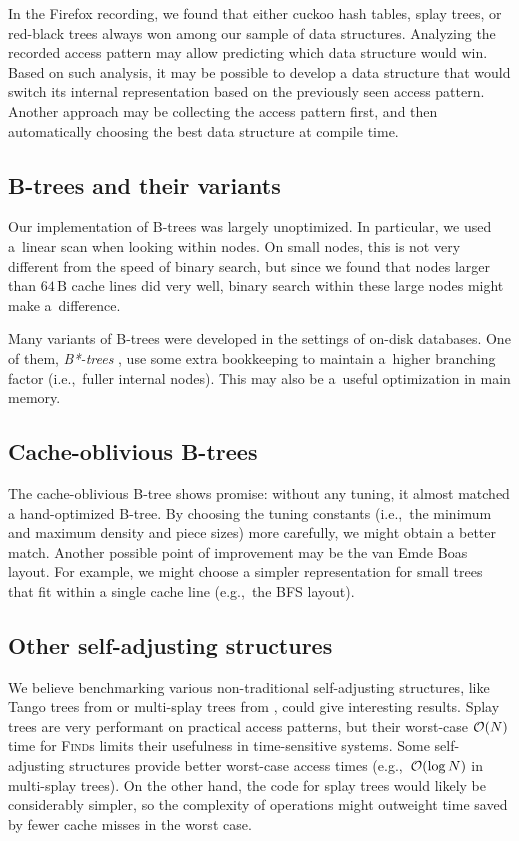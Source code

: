 In the Firefox recording, we found that either cuckoo hash tables, splay trees,
or red-black trees always won among our sample of data structures.
Analyzing the recorded access pattern may allow predicting which data structure
would win. Based on such analysis, it may be possible to develop a data
structure that would switch its internal representation based on the previously
seen access pattern.
Another approach may be collecting the access pattern first, and
then automatically choosing the best data structure at compile time.

\subsection*{B-trees and their variants}
Our implementation of \mbox{B-trees} was largely unoptimized. In particular,
we used a~linear scan when looking within nodes. On small nodes, this is
not very different from the speed of binary search, but since we found
that nodes larger than $64\,\text{B}$ cache lines did very well, binary search
within these large nodes might make a~difference.

Many variants of B-trees were developed in the settings of on-disk databases.
One of them, \emph{B*-trees} \cite{bstar}, use some extra bookkeeping to
maintain a~higher branching factor (i.e.,\ fuller internal nodes).
This may also be a~useful optimization in main memory.

\subsection*{Cache-oblivious B-trees}
The cache-oblivious B-tree shows promise: without any tuning, it almost
matched a hand-optimized B-tree. By choosing the tuning constants (i.e.,\ the
minimum and maximum density and piece sizes) more carefully, we might obtain
a better match. Another possible point of improvement may be the van Emde Boas
layout. For example, we might choose a simpler representation for small trees
that fit within a single cache line (e.g.,\ the BFS layout).

\subsection*{Other self-adjusting structures}
We believe benchmarking various non-traditional self-adjusting structures,
like Tango trees from \cite{tango} or multi-splay trees from
\cite{multisplay-trees}, could give interesting results. Splay trees are very
performant on practical access patterns, but their worst-case $\mathcal{O}(N)$ time
for \textsc{Find}s limits their usefulness in time-sensitive systems. Some self-adjusting
structures provide better worst-case access times (e.g.,\ $\mathcal{O}(\log N)$ in
multi-splay trees). On the other hand, the code for splay trees would
likely be considerably simpler, so the complexity of operations might outweight
time saved by fewer cache misses in the worst case.

